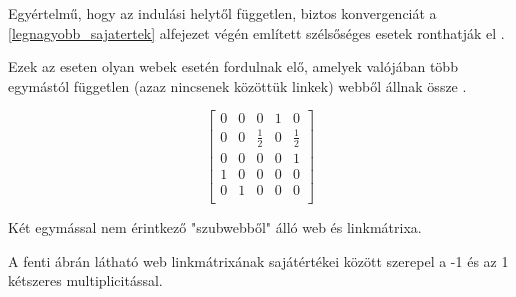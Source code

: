 \documentclass[12pt,a4paper]{article}
\begin{document}
Egyértelmű, hogy az indulási helytől független, biztos konvergenciát a \ref{legnagyobb_sajatertek} alfejezet végén említett szélsőséges esetek ronthatják el \cite{kleinproject}.

Ezek az eseten olyan webek esetén fordulnak elő, amelyek valójában több egymástól független (azaz nincsenek közöttük linkek) webből állnak össze \cite{kurt}.

\vspace{0.3cm}
\begin{minipage}{0.4\textwidth}
	\begin{center}
	\end{center}
\end{minipage}
\begin{minipage}{0.5\textwidth}
	\begin{center}
		\[
		\begin{bmatrix}
		0 & 0 & 0 & 1 & 0 \\
		0 & 0 & \frac{1}{2} & 0 & \frac{1}{2} \\
		0 & 0 & 0 & 0 & 1 \\
		1 & 0 & 0 & 0 & 0 \\
		0 & 1 & 0 & 0 & 0 \\
		\end{bmatrix}
		\]
	\end{center}
\end{minipage}
\vspace{0.3cm}
\newline
\centerline{Két egymással nem érintkező "szubwebből" álló web és linkmátrixa.}
\vspace{0.3cm}

A fenti ábrán látható web linkmátrixának sajátértékei között szerepel a -1 és az 1 kétszeres multiplicitással.



\end{document}
